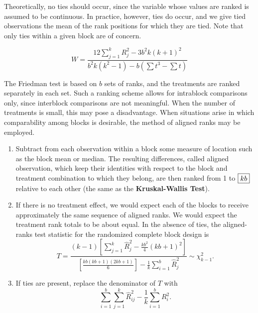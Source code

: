 Theoretically, no ties should occur, since the variable whose values are ranked is assumed to
be continuous. In practice, however, ties do occur, and we give tied observations the mean of the
rank positions for which they are tied. Note that only ties within a given block are of concern.

\begin{equation}
    W = \frac{12 \sum^k_{j=1} R^2_j - 3b^2 k(k+1)^2}{b^2k(k^2 - 1) - b \left( \sum t^3 - \sum t \right)}
\end{equation}

The Friedman test is based on $b$ sets of ranks, and the treatments are ranked separately in
each set. Such a ranking scheme allows for intrablock comparisons only, since interblock
comparisons are not meaningful. When the number of treatments is small, this may pose a
disadvantage. When situations arise in which comparability among blocks is desirable, the method
of aligned ranks may be employed.

\begin{enumerate}
    \item Subtract from each observation within a block some measure of location such as the block
mean or median. The resulting differences, called aligned observation, which keep their
identities with respect to the block and treatment combination to which they belong, are then
ranked from 1 to $\fbox{$kb$}$ relative to each other (the same as the \textbf{Kruskal-Wallis Test}).

    \item If there is no treatment effect, we would expect each of the blocks to receive approximately
the same sequence of aligned ranks. We would expect the treatment rank totals to be about
equal. In the absence of ties, the aligned-ranks test statistic for the randomized complete
block design is
\begin{equation}
    T = \frac{\displaystyle (k-1) \left[ \sum_{j=1}^{k} \widehat{R}^2_j - \frac{kb^2}{4}(kb+1)^2 \right]}{\displaystyle \left[ \frac{kb(kb+1)(2kb+1)}{6}\right] - \frac{1}{k} \sum_{i=1}^{b} \widehat{R}^2_j } \sim \chi^2_{k-1}.
\end{equation}

    \item If ties are present, replace the denominator of $T$ with 
        \begin{equation}
            \sum^b_{i=1} \sum^{k}_{j=1} \widehat{R}^2_{ij} - \frac{1}{k} \sum^b_{i=1} R^2_i.
        \end{equation}

\end{enumerate}

